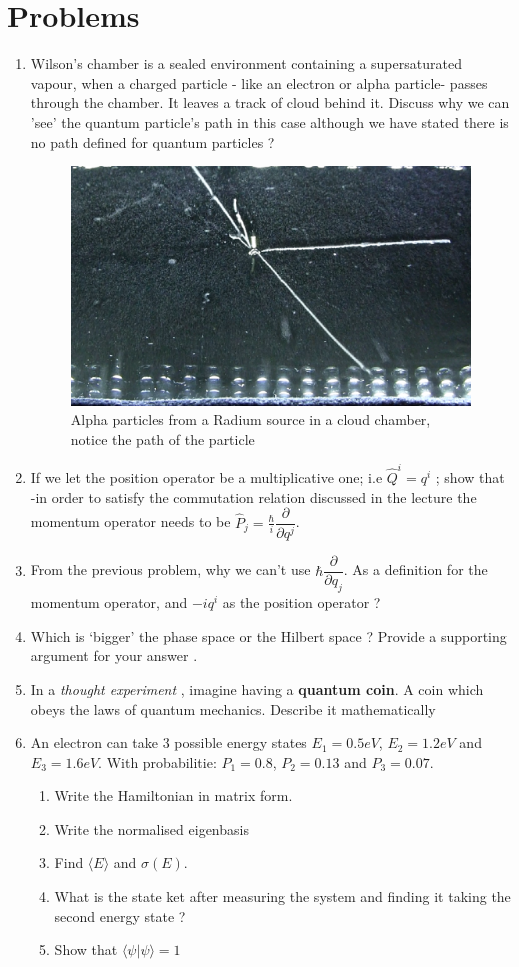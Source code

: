      \section{Problems}
     \begin{enumerate}
     	\item Wilson's chamber is a sealed environment containing a supersaturated vapour, when a charged particle - like an electron or alpha particle- passes through the chamber. It leaves a track of cloud behind it. Discuss why we can 'see' the quantum particle's path in this case although we have stated there is no path defined for quantum particles ?
     	\begin{figure} [h!]
     		\centering 
     		\includegraphics[width = 0.5 \textwidth]{./figures/wilson}
     		\caption{Alpha particles from a Radium source in a cloud chamber, notice the path of the particle}
     	\end{figure}
     	\item If we let the position operator be a multiplicative one; i.e  $ \hat{Q}^i = q^i$ ; show that -in order to satisfy the commutation relation discussed in the lecture the momentum operator needs to be $ \hat{P}_j = \frac{ \hbar}{i} \dfrac{\partial}{\partial q^j}$. 
     	\item From the previous problem, why we can't use $  \hbar \dfrac{\partial}{\partial q_j}$. As a definition for the momentum operator, and $-iq^i$ as the position operator  ? 
     	\item Which is `bigger' the phase space or the Hilbert space ? Provide a supporting argument for your answer .
     	\item In a \textit{thought experiment }, imagine having a \textbf{quantum coin}. A coin which obeys the laws of quantum mechanics. Describe it mathematically
     	\item An electron can take $3$ possible energy states $ E_1 = 0.5 eV$, $E_2 = 1.2 eV$ and $ E_3 = 1.6 eV$. With probabilitie: $ P_1 = 0.8$, $ P_2 = 0.13$ and $ P_3 = 0.07$. 
     	\begin{enumerate}
     		\item Write the Hamiltonian in matrix form.
     		\item Write the normalised eigenbasis
     		\item Find $ \langle E \rangle$ and $ \sigma (E)$. 
     		\item What is the state ket after measuring the system and finding it taking the second energy state ?
     		\item  Show that $\langle \psi | \psi \rangle =1 $ 
     	\end{enumerate}
 
     \end{enumerate}
     \nocite{*}